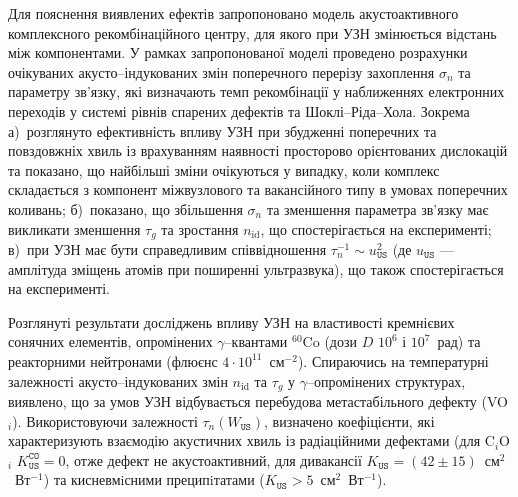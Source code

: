Для пояснення виявлених ефектів запропоновано модель акустоактивного комплексного рекомбінаційного центру,
для якого при УЗН змінюється відстань між компонентами.
У рамках запропонованої моделі проведено розрахунки очікуваних акусто--індукованих змін поперечного перерізу захоплення $\sigma_{n}$ та параметру зв'язку,
які визначають темп рекомбінації у наближеннях електронних переходів у системі рівнів спарених дефектів та  Шоклі--Ріда--Хола.
Зокрема
а)~розглянуто ефективність впливу УЗН при збудженні поперечних та повздовжніх хвиль із врахуванням наявності просторово орієнтованих дислокацій та показано, що найбільші зміни очікуються у випадку, коли комплекс складається з компонент міжвузлового та вакансійного типу  в умовах поперечних коливань;
б)~показано, що збільшення $\sigma_{n}$ та зменшення параметра зв'язку має викликати зменшення $\tau_g$ та зростання $n_\mathrm{id}$, що спостерігається на експерименті;
в)~при УЗН має бути справедливим співвідношення $\tau_{n}^{-1}\sim u_{\mathtt{US}}^2$ (де $u_\mathtt{US}$ --- амплітуда зміщень атомів при поширенні ультразвука), що також спостерігається на експерименті.

Розглянуті результати досліджень впливу УЗН на властивості кремнієвих сонячних елементів,
опромінених $\gamma$--квантами $^{60}$Co (дози $D$ $10^6$ і $10^7$~рад) та реакторними нейтронами (флюєнс $4\cdot10^{11}$~см$^{-2}$).
Спираючись на температурні залежності акусто--індукованих змін $n_\mathrm{id}$ та $\tau_{g}$ у $\gamma$--опромінених структурах, виявлено, що за умов УЗН відбувається  перебудова метастабільного дефекту (VO$_i$).
Використовуючи залежності $\tau_n(W_\mathtt{US})$,  визначено коефіцієнти, які характеризують взаємодію акустичних хвиль із радіаційними дефектами (для C$_i$O$_i$ $K_\mathtt{US}^\mathtt{CO}=0$, отже дефект не акустоактивний,
для дивакансії $K_\mathtt{US}=(42\pm15)$~см$^2$~Вт$^{-1}$)
та кисневмiсними преципiтатами ($K_\mathtt{US}>5$~см$^2$~Вт$^{-1}$).

